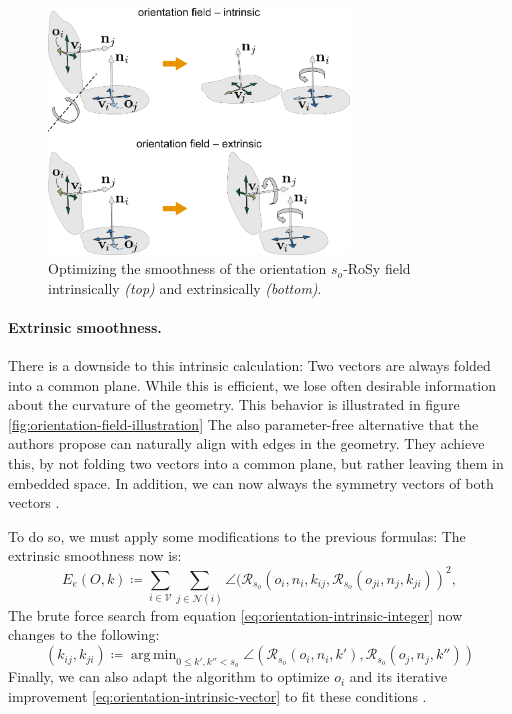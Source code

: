\documentclass{ACGSeminar}
\DeclareMathOperator*{\argmin}{arg\,min}
\begin{document}
\begin{figure}[htb!]
	\begin{centering}
		\includegraphics[width=8cm]{img/orientation-field-intrinsic-extrinsic.png}\par
	\end{centering}
	\caption{Optimizing the smoothness of the orientation $s_o$-RoSy field intrinsically \textit{(top)} and extrinsically \textit{(bottom)}. \cite{jakob2015instant}}
	\label{fig:orientation-field-intrinsic-extrinsic}
\end{figure}

\paragraph{Extrinsic smoothness.}
There is a downside to this intrinsic calculation: Two vectors are always folded into a common plane. While this is efficient, we lose often desirable information about the curvature of the geometry. This behavior is illustrated in figure \ref{fig:orientation-field-illustration} The also parameter-free alternative that the authors propose can naturally align with edges in the geometry. They achieve this, by not folding two vectors into a common plane, but rather leaving them in embedded space. In addition, we can now always the symmetry vectors of both vectors \cite{jakob2015instant}.\bigskip

To do so, we must apply some modifications to the previous formulas:
The extrinsic smoothness now is:
\begin{equation}\label{eq:orientation-extrinsic-energy}
	E_e(O,k) \coloneqq \sum_{i \in \mathcal{V}} \sum_{j \in \mathcal{N}(i)} \angle(\mathcal{R}_{s_o}(o_{i}, n_i, k_{ij}, \mathcal{R}_{s_o}(o_{ji}, n_j, k_{ji}))^2,
\end{equation}
The brute force search from equation \eqref{eq:orientation-intrinsic-integer} now changes to the following:
\begin{equation}\label{eq:orientation-extrinsic-integer}
	(k_{ij}, k_{ji}) \coloneqq \argmin_{0 \leq k',k'' < s_o} \angle(\mathcal{R}_{s_o}(o_i, n_i, k'), \mathcal{R}_{s_o}(o_j, n_j, k''))
\end{equation}
Finally, we can also adapt the algorithm to optimize $o_i$ and its iterative improvement \eqref{eq:orientation-intrinsic-vector} to fit these conditions \cite{jakob2015instant}.
\end{document}
